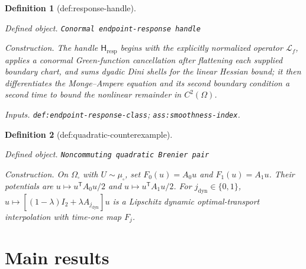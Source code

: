 \documentclass{article}
\newtheorem{definition}{Definition}
\begin{document}
\begin{definition}[def:response-handle]\label{def:response-handle}
\par\smallskip\noindent\emph{Defined object.} \texttt{Conormal endpoint-\allowbreak{}response handle}
\par\smallskip\noindent\emph{Construction.} The handle \(\mathsf H_{\mathrm{resp}}\) begins with the explicitly normalized operator \(\mathscr L_f\), applies a conormal Green-function cancellation after flattening each supplied boundary chart, and sums dyadic Dini shells for the linear Hessian bound; it then differentiates the Monge--Ampere equation and its second boundary condition a second time to bound the nonlinear remainder in \(C^2(\Omega)\).
\par\smallskip\noindent\emph{Inputs.} \texttt{def:\allowbreak{}endpoint-\allowbreak{}response-\allowbreak{}class}; \texttt{ass:\allowbreak{}smoothness-\allowbreak{}index}.
\end{definition}

\begin{definition}[def:quadratic-counterexample]\label{def:quadratic-counterexample}
\par\smallskip\noindent\emph{Defined object.} \texttt{Noncommuting quadratic Brenier pair}
\par\smallskip\noindent\emph{Construction.} On \(\Omega_{\square}\) with \(U\sim\mu_{\square}\), set \(F_0(u)=A_0u\) and \(F_1(u)=A_1u\). Their potentials are \(u\mapsto u^{\mathsf T}A_0u/2\) and \(u\mapsto u^{\mathsf T}A_1u/2\). For \(j_{\mathrm{dyn}}\in\{0,1\}\), \(u\mapsto[(1-\lambda)I_2+\lambda A_{j_{\mathrm{dyn}}}]u\) is a Lipschitz dynamic optimal-transport interpolation with time-one map \(F_j\).
\end{definition}

\section{Main results}
\end{document}
